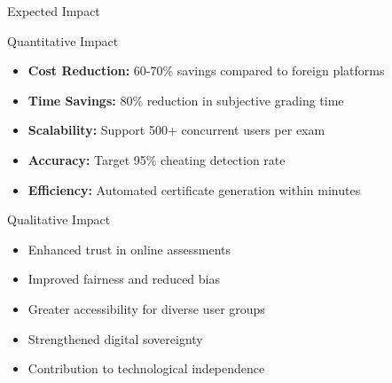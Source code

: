 \begin{frame}{Expected Impact}
    \begin{block}{Quantitative Impact}
        \begin{itemize}
            \item \textbf{Cost Reduction:} 60-70\% savings compared to foreign platforms
            \item \textbf{Time Savings:} 80\% reduction in subjective grading time
            \item \textbf{Scalability:} Support 500+ concurrent users per exam
            \item \textbf{Accuracy:} Target 95\% cheating detection rate
            \item \textbf{Efficiency:} Automated certificate generation within minutes
        \end{itemize}
    \end{block}
    
    \begin{block}{Qualitative Impact}
        \begin{itemize}
            \item Enhanced trust in online assessments
            \item Improved fairness and reduced bias
            \item Greater accessibility for diverse user groups
            \item Strengthened digital sovereignty
            \item Contribution to technological independence
        \end{itemize}
    \end{block}
\end{frame}

